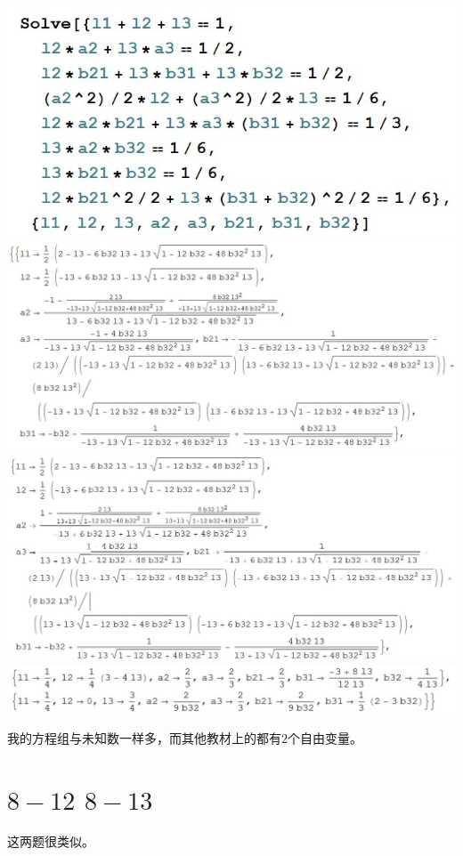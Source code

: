 \documentclass{article}
\begin{document}
\begin{CJK*}{UTF8}{gbsn}
\includegraphics[scale = 0.5]{0.jpg} \\
\includegraphics[scale = 0.5]{a.jpg} \\
\includegraphics[scale = 0.5]{b.jpg} \\
\includegraphics[scale = 0.5]{c.jpg}

我的方程组与未知数一样多，而其他教材上的都有$2$个自由变量。

\section{$8-12$ $8-13$}
这两题很类似。


\end{CJK*}
\end{document}
